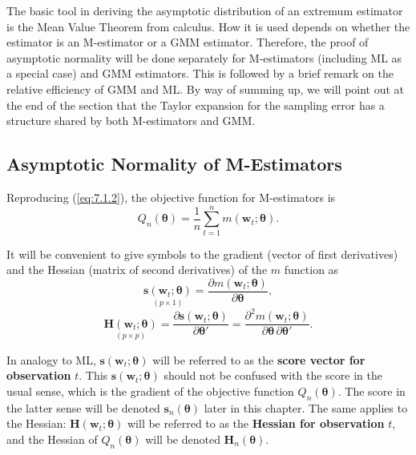 
The basic tool in deriving the asymptotic distribution of an extremum estimator is the Mean Value Theorem from calculus. How it is used depends on whether the estimator is an M-estimator or a GMM estimator. Therefore, the proof of asymptotic normality will be done separately for M-estimators (including ML as a special case) and GMM estimators. This is followed by a brief remark on the relative efficiency of GMM and ML. By way of summing up, we will point out at the end of the section that the Taylor expansion for the sampling error has a structure shared by both M-estimators and GMM.

\subsection*{Asymptotic Normality of M-Estimators}

Reproducing (\ref{eq:7.1.2}), the objective function for M-estimators is
\begin{equation}
\label{eq:7.3.1}
Q_n(\bm{\theta}) = \frac{1}{n} \sum_{t=1}^{n} m(\mathbf{w}_t; \bm{\theta}).
\end{equation}

It will be convenient to give symbols to the gradient (vector of first derivatives) and the Hessian (matrix of second derivatives) of the $m$ function as
\begin{equation}
\label{eq:7.3.2}
\underset{(p \times 1)}{\mathbf{s}(\mathbf{w}_t; \bm{\theta})} = \frac{\partial m(\mathbf{w}_t; \bm{\theta})}{\partial \bm{\theta}},
\end{equation}
\begin{equation}
\label{eq:7.3.3}
\underset{(p \times p)}{\mathbf{H}(\mathbf{w}_t; \bm{\theta})} = \frac{\partial \mathbf{s}(\mathbf{w}_t; \bm{\theta})}{\partial \bm{\theta}'} = \frac{\partial^2 m(\mathbf{w}_t; \bm{\theta})}{\partial \bm{\theta} \, \partial \bm{\theta}'}.
\end{equation}

In analogy to ML, $\mathbf{s}(\mathbf{w}_t; \bm{\theta})$ will be referred to as the \textbf{score vector for observation} $t$. This $\mathbf{s}(\mathbf{w}_t; \bm{\theta})$ should not be confused with the score in the usual sense, which is the gradient of the objective function $Q_n(\bm{\theta})$. The score in the latter sense will be denoted $\mathbf{s}_n(\bm{\theta})$ later in this chapter. The same applies to the Hessian: $\mathbf{H}(\mathbf{w}_t; \bm{\theta})$ will be referred to as the \textbf{Hessian for observation} $t$, and the Hessian of $Q_n(\bm{\theta})$ will be denoted $\mathbf{H}_n(\bm{\theta})$.

